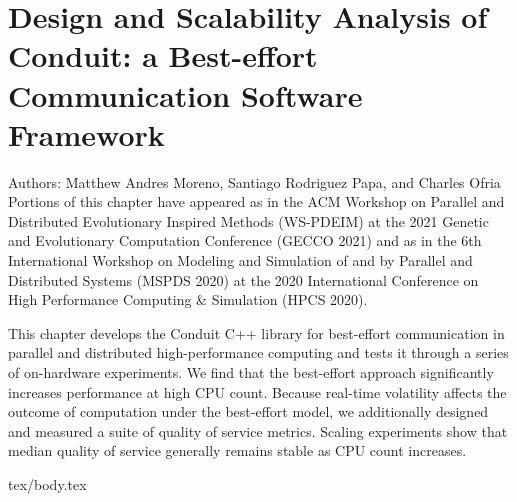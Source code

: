 \chapter{Design and Scalability Analysis of Conduit: a Best-effort Communication Software Framework}
\label{ch:conduit}

\noindent
Authors: Matthew Andres Moreno, Santiago Rodriguez Papa, and Charles Ofria \\
Portions of this chapter have appeared as \citep{moreno2021conduit} in the ACM Workshop on Parallel and Distributed Evolutionary Inspired Methods (WS-PDEIM) at the 2021 Genetic and Evolutionary Computation Conference (GECCO 2021) and as \citep{moreno2020conduit} in the 6th International Workshop on Modeling and Simulation of and by Parallel and Distributed Systems (MSPDS 2020) at the 2020 International Conference on High Performance Computing \& Simulation (HPCS 2020).

This chapter develops the Conduit C++ library for best-effort communication in parallel and distributed high-performance computing and tests it through a series of on-hardware experiments.
We find that the best-effort approach significantly increases performance at high CPU count.
Because real-time volatility affects the outcome of computation under the best-effort model, we additionally designed and measured a suite of quality of service metrics.
Scaling experiments show that median quality of service generally remains stable as CPU count increases.

{tex/body.tex}

